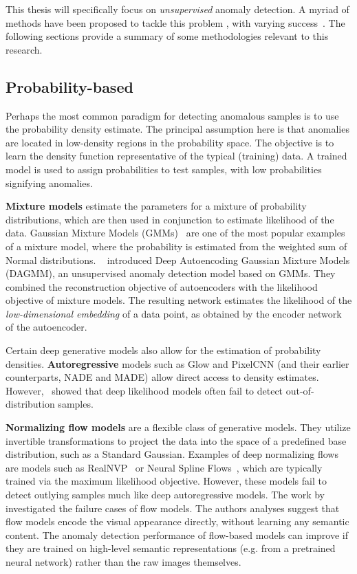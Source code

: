 This thesis will specifically focus on \textit{unsupervised} anomaly detection. A myriad of methods have been proposed to tackle this problem \cite{pang_deep_2021,ruff_unifying_2021}, with varying success~\cite{han2022adbench}. The following sections provide a summary of some methodologies relevant to this research.

\subsection*{Probability-based}


Perhaps the most common paradigm for detecting anomalous samples is to use the probability density estimate. The principal assumption here is that anomalies are located in low-density regions in the probability space. The objective is to learn the density function representative of the typical (training) data. A trained model is used to assign probabilities to test samples, with low probabilities signifying anomalies.

\textbf{Mixture models} estimate the parameters for a mixture of probability distributions, which are then used in conjunction to estimate likelihood of the data. Gaussian Mixture Models (GMMs)~\cite{reynolds2009gaussian} are one of the most popular examples of a mixture model, where the probability is estimated from the weighted sum of Normal distributions. ~\cite{zong2018deep} introduced Deep Autoencoding Gaussian Mixture Models (DAGMM), an unsupervised anomaly detection model based on GMMs. They combined the reconstruction objective of autoencoders with the likelihood objective of mixture models. The resulting network estimates the likelihood of the \textit{low-dimensional embedding} of a data point, as obtained by the encoder network of the autoencoder. 

Certain deep generative models also allow for the estimation of probability densities. \textbf{Autoregressive} models such as Glow and PixelCNN (and their earlier counterparts, NADE and MADE) allow direct access to density estimates. However,~\cite{nalisnick2018do} showed that deep likelihood models often fail to detect out-of-distribution samples.

\textbf{Normalizing flow models} are a flexible class of generative models. They utilize invertible transformations to project the data into the space of a predefined base distribution, such as a Standard Gaussian. Examples of deep normalizing flows are models such as RealNVP~\cite{dinh2017density} or Neural Spline Flows~\cite{NEURIPS2019_7ac71d43}, which are typically trained via the maximum likelihood objective. However, these models fail to detect outlying samples much like deep autoregressive models. The work by ~\cite{normflow_fails} investigated the failure cases of flow models. The authors analyses suggest that flow models encode the visual appearance directly, without learning any semantic content. The anomaly detection performance of flow-based models can improve if they are trained on high-level semantic representations (e.g. from a pretrained neural network) rather than the raw images themselves. 


